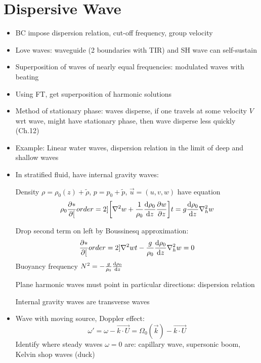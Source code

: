 \section{Dispersive Wave}
\begin{itemize}
    \item BC impose dispersion relation, cut-off frequency, group velocity
    \item Love waves: waveguide (2 boundaries with TIR) and SH wave can self-sustain
    \item Superposition of waves of nearly equal frequencies: modulated waves with beating
    \item Using FT, get superposition of harmonic solutions
    \item Method of stationary phase: waves disperse, if one travels at some velocity $V$ wrt wave, might have stationary phase, then wave disperse less quickly (Ch.12)
    \item Example: Linear water waves, dispersion relation in the limit of deep and shallow waves
    \item In stratified fluid, have internal gravity waves:
    
    Density $\rho=\rho_0(z) + \tilde{\rho}$, $p = p_0 + \tilde{p}$, $\vec{u} = (u,v,w)$ have equation 
    \[\rho_0 \frac{\partial{*}}{\partial{[}}order=2]{\left[\nabla^2 w + \frac{1}{\rho_0} \frac{\mathrm{d} {\rho_0}}{\mathrm{d} {z}} \frac{\partial{w}}{\partial{z}}\right]}{t} = g \frac{\mathrm{d}{\rho_0}}{\mathrm{d}{z}} \nabla^2_h w\]

    Drop second term on left by Boussinesq approximation: 
    \[\frac{\partial{*}}{\partial{[}}order=2]{\nabla^2 w }{t} - \frac{g}{ \rho_0} \frac{\mathrm{d}{\rho_0}}{\mathrm{d}{z}} \nabla^2_h w = 0\]
    Buoyancy frequency $N^2 = - \frac{g}{ \rho_0} \frac{\mathrm{d}{\rho_0}}{\mathrm{d}{z}}$

    Plane harmonic waves must point in particular directions: dispersion relation

    Internal gravity waves are transverse waves

    \item Wave with moving source, Doppler effect:
    \[\omega' = \omega - \vec{k\cdot  U} = \Omega_0(\vec{k}) - \vec{k\cdot  U} \]
    Identify where steady waves $\omega=0$ are: capillary wave, supersonic boom, Kelvin shop waves (duck) 
\end{itemize}
